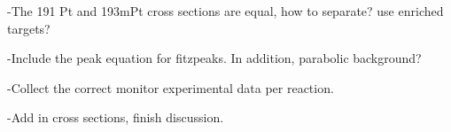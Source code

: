 -The 191 Pt and 193mPt cross sections are equal, how to separate? use enriched targets? 

-Include the peak equation for fitzpeaks. In addition, parabolic background? 

-Collect the correct monitor experimental data per reaction. 

-Add in cross sections, finish discussion. 